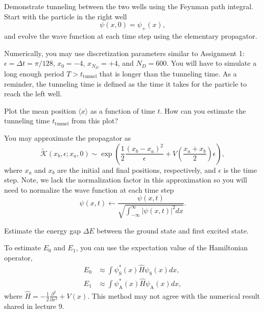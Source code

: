 \begin{problem}[10]
Demonstrate tunneling between the two wells using the Feynman path integral.
Start with the particle in the right well
\begin{equation}
  \psi(x, 0) = \psi_+(x),
\end{equation}
and evolve the wave function at each time step using the elementary propagator.

Numerically, you may use discretization parameters similar to Assignment 1: $\epsilon = \Delta t = \pi/128$, $x_0 = -4$, $x_{N_D} = +4$, and $N_D=600$.
You will have to simulate a long enough period $T > t_\mathrm{tunnel}$ that is longer than the tunneling time.
As a reminder, the tunneling time is defined as the time it takes for the particle to reach the left well.

Plot the mean position $\langle x \rangle$ as a function of time $t$.
How can you estimate the tunneling time $t_\mathrm{tunnel}$ from this plot?

\begin{hint}
  You may approximate the propagator as
  \begin{equation}
    \tilde {\mathcal K}(x_b, \epsilon; x_a, 0) \sim \exp \left( \frac{1}{2}\frac{(x_b - x_a)^2}{\epsilon} + V(\frac{x_a+x_b}{2})\epsilon \right),
  \end{equation}
  where $x_a$ and $x_b$ are the initial and final positions, respectively, and $\epsilon$ is the time step.
  Note, we lack the normalization factor in this approximation so you will need to normalize the wave function at each time step
  \begin{equation}
    \psi(x, t) \leftarrow \frac{\psi(x, t)}{\sqrt{\int_{-\infty}^{\infty} |\psi(x, t)|^2 dx}}.
  \end{equation}
\end{hint}
\end{problem}

\begin{solution}
\end{solution}

\begin{problem}[10]
Estimate the energy gap $\Delta E$ between the ground state and first excited state.

\begin{hint}
  To estimate $E_0$ and $E_1$, you can use the expectation value of the Hamiltonian operator,
  \begin{align}
    E_0 & \approx \int \psi_\mathrm{S}^*(x) \hat H \psi_\mathrm{S}(x) dx, \\
    E_1 & \approx \int \psi_\mathrm{A}^*(x) \hat H \psi_\mathrm{A}(x) dx,
  \end{align}
  where $\hat H = -\frac{1}{2}\frac{\partial^2}{\partial x^2} + V(x)$.
  This method may not agree with the numerical result shared in lecture 9.
\end{hint}
\end{problem}

